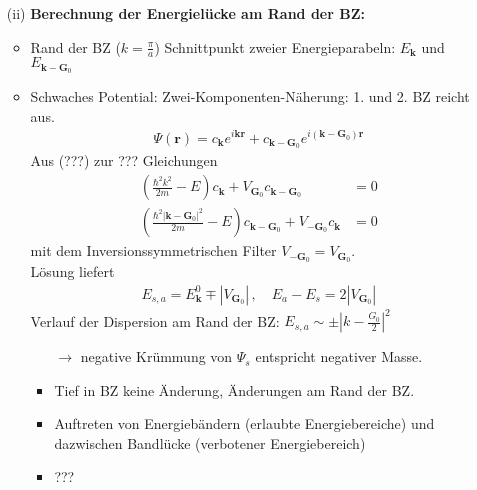 \begin{itemize}
\begin{itemize}
            \item[(ii)] \textbf{Berechnung der Energielücke am Rand der BZ:}\\
            \begin{itemize}
                \item Rand der BZ ($k = \frac{\pi}{a}$) Schnittpunkt zweier Energieparabeln: $E_{\textbf{k}}$ und $E_{\textbf{k}-\textbf{G}_0}$
                \item Schwaches Potential: Zwei-Komponenten-Näherung: 1. und 2. BZ reicht aus.
                \begin{align*}
                    \Psi(\textbf{r}) = c_{\textbf{k}} e^{i \textbf{k} \textbf{r}} + c_{\textbf{k}-\textbf{G}_0} e^{i(\textbf{k}-\textbf{G}_0) \textbf{r}}
                \end{align*}
                Aus (???) zur ??? Gleichungen
                \begin{align*}
                    \left(\frac{\hbar^2 k^2}{2m}-E\right) c_{\textbf{k}} + V_{\textbf{G}_0} c_{\textbf{k}-\textbf{G}_0} &= 0\\
                    \left(\frac{\hbar^2 \left|\textbf{k}-\textbf{G}_0\right|^2}{2m}-E\right) c_{\textbf{k}-\textbf{G}_0} + V_{-\textbf{G}_0} c_{\textbf{k}} &= 0
                \end{align*}
                mit dem Inversionssymmetrischen Filter $V_{-\textbf{G}_0} = V_{\textbf{G}_0}$.\\
                Lösung liefert
                \begin{align*}
                    E_{s,a} = E_{\textbf{k}}^0 \mp \left|V_{\textbf{G}_0} \right| \, , \quad E_a-E_s=2 \left|V_{\textbf{G}_0}\right|
                \end{align*}
                Verlauf der Dispersion am Rand der BZ: $E_{s,a} \sim \pm \left| k - \frac{G_0}{2} \right|^2$\\
                \begin{itemize}
                    \item[$\rightarrow$] negative Krümmung von $\Psi_s$ entspricht negativer Masse.
                    \item Tief in BZ keine Änderung, Änderungen am Rand der BZ.
                    \item Auftreten von Energiebändern (erlaubte Energiebereiche) und dazwischen Bandlücke (verbotener Energiebereich)
                    \item ???
                \end{itemize}
            \end{itemize}

\end{itemize}
\end{itemize}

